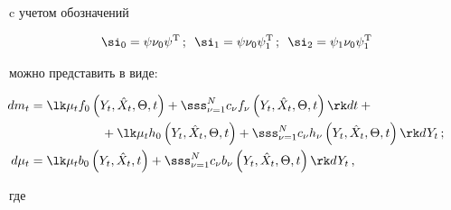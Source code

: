 c учетом обозначений



\noindent

\begin{equation*}

\si_0 = \psi\nu_0 \psi^{\mathrm{T}}\,; 

\enskip\si_1 = \psi\nu_0 \psi_1^{\mathrm{T}}\,; \enskip 

\si_2 = \psi_1\nu_0 \psi_1^{\mathrm{T}}


\end{equation*}

можно представить в виде:



\noindent

\begin{align}

    \hspace*{-10mm}dm_t &= \lk\mu_t f_0 \left(Y_t,\hat X_t,\Theta, t\right) +

    \sss_{\nu=1}^N c_\nu f_\nu \left(Y_t,\hat X_t,\Theta, t\right)\rk dt+{}\notag\\

&\hspace*{20mm}{}+ \lk \mu_t h_0 \left(Y_t,\hat X_t,\Theta, t\right) +\sss_{\nu=1}^N c_\nu

    h_\nu \left(Y_t,\hat X_t,\Theta, t\right) \rk dY_t\,;\label{e3.6-s2}\\

        \hspace*{-10mm}d\mu_t &=\lk\mu_t b_0 \left(Y_t,\hat   X_t,t\right)+

    \sss_{\nu=1}^N c_\nu b_\nu \left(Y_t,\hat X_t,\Theta, t\right) \rk dY_t\,,

    \label{e3.7-s2}

    \end{align}

где

